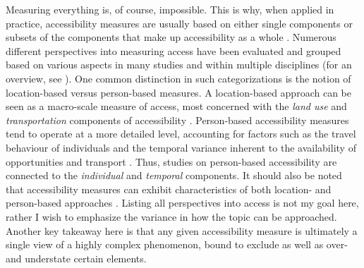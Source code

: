 Measuring everything is, of course, impossible.
This is why, when applied in practice, accessibility measures
are usually based on either single components
or subsets of the components that make up accessibility as a whole \parencite{geu2004}.
Numerous different perspectives into measuring access have been
evaluated and grouped based on various aspects
in many studies and within multiple disciplines
(for an overview, see \textcite{wu2020}).
One common distinction in such categorizations
is the notion of location-based versus person-based measures.
A location-based approach can be seen as a macro-scale measure of access,
most concerned with the \textit{land use} and \textit{transportation}
components of accessibility \parencite{geu2004}.
Person-based accessibility measures tend to operate at a more detailed level,
accounting for factors such as the travel behaviour of individuals and
the temporal variance inherent to the availability of
opportunities and transport \parencite{neu2012, neu2011, kwa1998, kwa2003}.
Thus, studies on person-based accessibility are connected to
the \textit{individual} and \textit{temporal} components.
It should also be noted that accessibility measures can exhibit characteristics of
both location- and person-based approaches \parencite{jar2018}.
Listing all perspectives into access is not my goal here,
rather I wish to emphasize the variance in how the topic can be approached.
Another key takeaway here is that any given accessibility measure is ultimately
a single view of a highly complex phenomenon,
bound to exclude as well as over- and understate certain elements.





